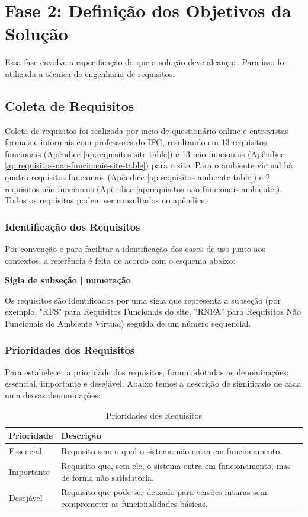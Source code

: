 \section{Fase 2: Definição dos Objetivos da Solução}\label{definicao_dos_objetivos_da_solucao}
Essa fase envolve a especificação do que a solução deve alcançar. Para isso foi utilizada a técnica de engenharia de requisitos.
\subsection{Coleta de Requisitos}
Coleta de requisitos foi realizada por meio de questionário online e entrevistas formais e informais com professores do IFG, resultando em 13 requisitos funcionais (Apêndice \ref{ap:requisitos-site-table}) e 13 não funcionais (Apêndice \ref{ap:requisitos-nao-funcionais-site-table}) para o site. Para o ambiente virtual há quatro requisitos funcionais (Apêndice \ref{ap:requisitos-ambiente-table}) e 2 requisitos não funcionais (Apêndice \ref{ap:requisitos-nao-funcionais-ambiente}). Todos os requisitos podem ser consultados no apêndice. 

\subsubsection{Identificação dos Requisitos}
\label{sec:identificacao_requisitos}

Por convenção e para facilitar a identificação dos casos de uso junto aos contextos, a referência é feita de acordo com o esquema abaixo:

\textbf{Sigla de subseção | numeração}

Os requisitos são identificados por uma sigla que representa a subseção (por exemplo, "RFS" para Requisitos Funcionais do site, “RNFA” para Requisitos Não Funcionais do Ambiente Virtual) seguida de um número sequencial.

\subsubsection{Prioridades dos Requisitos}
\label{sec:prioridades_requisitos}

Para estabelecer a prioridade dos requisitos, foram adotadas as denominações: essencial, importante e desejável. Abaixo temos a descrição de significado de cada uma dessas denominações:

\begin{table}[H]
\centering
\caption{Prioridades dos Requisitos}
\label{tab:prioridades_requisitos}
\begin{tabular}{|l|p{10cm}|}
\hline
\textbf{Prioridade} & \textbf{Descrição} \\ \hline
Essencial & Requisito sem o qual o sistema não entra em funcionamento. \\ \hline
Importante & Requisito que, sem ele, o sistema entra em funcionamento, mas de forma não satisfatória. \\ \hline
Desejável & Requisito que pode ser deixado para versões futuras sem comprometer as funcionalidades básicas. \\ \hline
\end{tabular}
\end{table}

